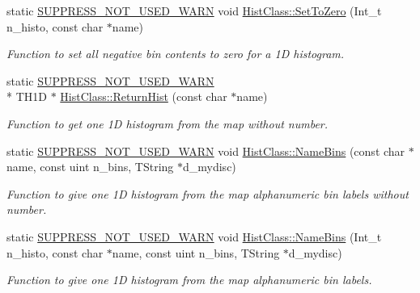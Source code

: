 \begin{DoxyCompactItemize}
static \hyperlink{HistClass_8hh_a85edd6ac47f5ea2970c76af20855738c}{S\-U\-P\-P\-R\-E\-S\-S\-\_\-\-N\-O\-T\-\_\-\-U\-S\-E\-D\-\_\-\-W\-A\-R\-N} void \hyperlink{namespaceHistClass_a24772b9dfe740281c6f265d735544bef}{Hist\-Class\-::\-Set\-To\-Zero} (Int\-\_\-t n\-\_\-histo, const char $\ast$name)
\begin{DoxyCompactList}\small\item\em Function to set all negative bin contents to zero for a 1\-D histogram. \end{DoxyCompactList}\item 
static \hyperlink{HistClass_8hh_a85edd6ac47f5ea2970c76af20855738c}{S\-U\-P\-P\-R\-E\-S\-S\-\_\-\-N\-O\-T\-\_\-\-U\-S\-E\-D\-\_\-\-W\-A\-R\-N} \\*
T\-H1\-D $\ast$ \hyperlink{namespaceHistClass_adfd24a84c12f9e51ec06bbeba6b83c39}{Hist\-Class\-::\-Return\-Hist} (const char $\ast$name)
\begin{DoxyCompactList}\small\item\em Function to get one 1\-D histogram from the map without number. \end{DoxyCompactList}\item 
static \hyperlink{HistClass_8hh_a85edd6ac47f5ea2970c76af20855738c}{S\-U\-P\-P\-R\-E\-S\-S\-\_\-\-N\-O\-T\-\_\-\-U\-S\-E\-D\-\_\-\-W\-A\-R\-N} void \hyperlink{namespaceHistClass_acb93f9b104c1f0f129109190caaf447b}{Hist\-Class\-::\-Name\-Bins} (const char $\ast$name, const uint n\-\_\-bins, T\-String $\ast$d\-\_\-mydisc)
\begin{DoxyCompactList}\small\item\em Function to give one 1\-D histogram from the map alphanumeric bin labels without number. \end{DoxyCompactList}\item 
static \hyperlink{HistClass_8hh_a85edd6ac47f5ea2970c76af20855738c}{S\-U\-P\-P\-R\-E\-S\-S\-\_\-\-N\-O\-T\-\_\-\-U\-S\-E\-D\-\_\-\-W\-A\-R\-N} void \hyperlink{namespaceHistClass_a618a4e823e746a518833b35d2992619a}{Hist\-Class\-::\-Name\-Bins} (Int\-\_\-t n\-\_\-histo, const char $\ast$name, const uint n\-\_\-bins, T\-String $\ast$d\-\_\-mydisc)
\begin{DoxyCompactList}\small\item\em Function to give one 1\-D histogram from the map alphanumeric bin labels. \end{DoxyCompactList}\end{DoxyCompactItemize}

